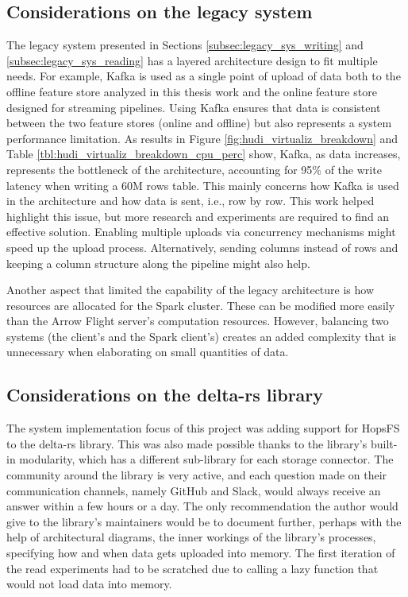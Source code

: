\subsection{Considerations on the legacy system}

The legacy system presented in Sections \ref{subsec:legacy_sys_writing} and \ref{subsec:legacy_sys_reading} has a layered architecture design to fit multiple needs. For example, Kafka is used as a single point of upload of data both to the offline feature store analyzed in this thesis work and the online feature store designed for streaming pipelines. Using Kafka ensures that data is consistent between the two feature stores (online and offline) but also represents a system performance limitation. As results in Figure \ref{fig:hudi_virtualiz_breakdown} and Table \ref{tbl:hudi_virtualiz_breakdown_cpu_perc} show, Kafka, as data increases, represents the bottleneck of the architecture, accounting for 95\% of the write latency when writing a 60M rows table. This mainly concerns how Kafka is used in the architecture and how data is sent, i.e., row by row. 
This work helped highlight this issue, but more research and experiments are required to find an effective solution. Enabling multiple uploads via concurrency mechanisms might speed up the upload process. Alternatively, sending columns instead of rows and keeping a column structure along the pipeline might also help. 

Another aspect that limited the capability of the legacy architecture is how resources are allocated for the Spark cluster. These can be modified more easily than the Arrow Flight server's computation resources. However, balancing two systems (the client's and the Spark client's) creates an added complexity that is unnecessary when elaborating on small quantities of data.

\subsection{Considerations on the delta-rs library}

The system implementation focus of this project was adding support for \gls{HopsFS} to the delta-rs library. This was also made possible thanks to the library's built-in modularity, which has a different sub-library for each storage connector. The community around the library is very active, and each question made on their communication channels, namely GitHub and Slack, would always receive an answer within a few hours or a day. The only recommendation the author would give to the library's maintainers would be to document further, perhaps with the help of architectural diagrams, the inner workings of the library's processes, specifying how and when data gets uploaded into memory. The first iteration of the read experiments had to be scratched due to calling a lazy function that would not load data into memory. 

